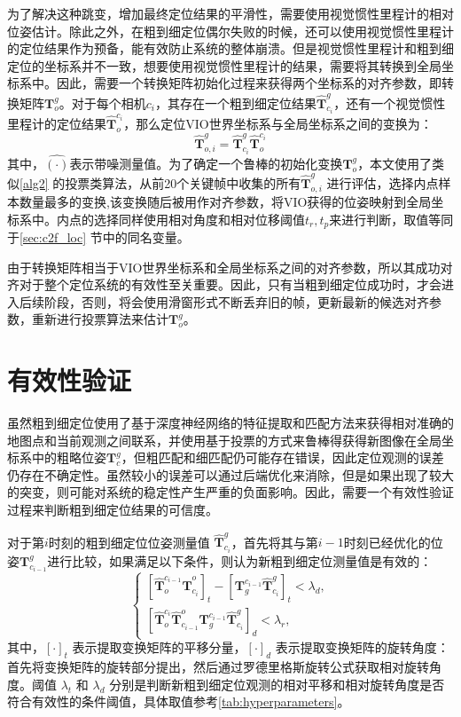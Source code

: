 为了解决这种跳变，增加最终定位结果的平滑性，需要使用视觉惯性里程计的相对位姿估计。除此之外，在粗到细定位偶尔失败的时候，还可以使用视觉惯性里程计的定位结果作为预备，能有效防止系统的整体崩溃。但是视觉惯性里程计和粗到细定位的坐标系并不一致，想要使用视觉惯性里程计的结果，需要将其转换到全局坐标系中。因此，需要一个转换矩阵初始化过程来获得两个坐标系的对齐参数，即转换矩阵$\symbf{T}_o^{g}$。对于每个相机$c_i$，其存在一个粗到细定位结果$\hat{\symbf{T}}^{g}_{c_i}$，还有一个视觉惯性里程计的定位结果$\hat{\symbf{T}}_{o}^{c_i}$，那么定位VIO世界坐标系与全局坐标系之间的变换为：
\begin{equation}
    \hat{\symbf{T}}_{o,i}^g = {\hat{\symbf{T}}^{g}_{c_i}} \hat{\symbf{T}}_{o}^{c_i}
\end{equation}
其中，${\hat{(\cdot)}}$表示带噪测量值。为了确定一个鲁棒的初始化变换$\symbf{T}_{o}^g$，本文使用了类似\ref{alg2} 的投票类算法，从前20个关键帧中收集的所有$\hat{\symbf{T}}_{o,i}^g$ 进行评估，选择内点样本数量最多的变换,该变换随后被用作对齐参数，将VIO获得的位姿映射到全局坐标系中。内点的选择同样使用相对角度和相对位移阈值$t_r,t_p$来进行判断，取值等同于\ref{sec:c2f_loc} 节中的同名变量。

由于转换矩阵相当于VIO世界坐标系和全局坐标系之间的对齐参数，所以其成功对齐对于整个定位系统的有效性至关重要。因此，只有当粗到细定位成功时，才会进入后续阶段，否则，将会使用滑窗形式不断丢弃旧的帧，更新最新的候选对齐参数，重新进行投票算法来估计$\symbf{T}_o^{g}$。

\section{有效性验证}
\label{sec:valid}
虽然粗到细定位使用了基于深度神经网络的特征提取和匹配方法来获得相对准确的地图点和当前观测之间联系，并使用基于投票的方式来鲁棒得获得新图像在全局坐标系中的粗略位姿$\symbf{T}_{c}^g$，但粗匹配和细匹配仍可能存在错误，因此定位观测的误差仍存在不确定性。虽然较小的误差可以通过后端优化来消除，但是如果出现了较大的突变，则可能对系统的稳定性产生严重的负面影响。因此，需要一个有效性验证过程来判断粗到细定位结果的可信度。

对于第$i$时刻的粗到细定位位姿测量值 ${\hat{\symbf{T}}^{g}_{c_i}}$，首先将其与第$i-1$时刻已经优化的位姿${\symbf{T}}^{g}_{c_{i-1}}$进行比较，如果满足以下条件，则认为新粗到细定位测量值是有效的：
\begin{equation}
\label{eq:check}
\begin{cases}
    [\hat{\symbf{T}}_{o}^{c_{i-1}}\hat{\symbf{T}}^{o}_{c_i}]_{t} - [\symbf{T}_{g}^{c_{i-1}}\hat{\symbf{T}}^{g}_{c_i}]_{t} < \lambda_{d}, \\
    [\hat{\symbf{T}}^{c_i}_o \hat{\symbf{T}}_{c_{i-1}}^o \symbf{T}^{c_{i-1}}_g \hat{\symbf{T}}_{c_{i}}^g]_{d} < \lambda_{r},
\end{cases}
\end{equation}
其中，$[\cdot]_{t}$ 表示提取变换矩阵的平移分量，$[\cdot]_{d}$ 表示提取变换矩阵的旋转角度：首先将变换矩阵的旋转部分提出，然后通过罗德里格斯旋转公式获取相对旋转角度。阈值 $\lambda_{t}$ 和 $\lambda_{d}$ 分别是判断新粗到细定位观测的相对平移和相对旋转角度是否符合有效性的条件阈值，具体取值参考\ref{tab:hyperparameters}。

